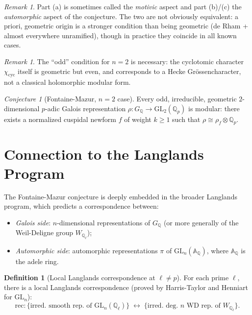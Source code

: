 \documentclass[12pt,a4paper]{amsart}
\theoremstyle{definition}
\newtheorem{definition}[theorem]{Definition}
\theoremstyle{remark}
\newtheorem{remark}[theorem]{Remark}
\newtheorem{conjecture}[theorem]{Conjecture}
\newcommand{\GL}{\mathrm{GL}}
\newcommand{\Qp}{\mathbb{Q}_p}
\newcommand{\GQ}{G_{\mathbb{Q}}}
\newcommand{\rec}{\mathrm{rec}}
\newcommand{\Q}{\mathbb{Q}}
\begin{document}
\begin{remark}
  Part (a) is sometimes called the \emph{motivic} aspect and part (b)/(c) the
  \emph{automorphic} aspect of the conjecture. The two are not obviously equivalent: a
  priori, geometric origin is a stronger condition than being geometric (de Rham + almost
  everywhere unramified), though in practice they coincide in all known cases.
\end{remark}

\begin{remark}
  The ``odd'' condition for $n=2$ is necessary: the cyclotomic character
  $\chi_{\mathrm{cyc}}$ itself is geometric but even, and corresponds to a Hecke
  Grössencharacter, not a classical holomorphic modular form.
\end{remark}

\begin{conjecture}[Fontaine-Mazur, $n=2$ case]\label{conj:FM2}
  Every odd, irreducible, geometric $2$-dimensional $p$-adic Galois representation
  $\rho\colon \GQ \to \GL_2(\Qp)$
  is modular: there exists a normalized cuspidal newform $f$ of weight $k \geq 1$ such
  that $\rho \cong \rho_f \otimes \Qp$.
\end{conjecture}

\section{Connection to the Langlands Program}\label{sec:langlands}

The Fontaine-Mazur conjecture is deeply embedded in the broader Langlands program, which
predicts a correspondence between:
\begin{itemize}
  \item \emph{Galois side}: $n$-dimensional representations of $\GQ$ (or more generally of
    the Weil-Deligne group $W_{\Q_\ell}$);
  \item \emph{Automorphic side}: automorphic representations $\pi$ of $\GL_n(\mathbb{A}_\Q)$,
    where $\mathbb{A}_\Q$ is the adele ring.
\end{itemize}

\begin{definition}[Local Langlands correspondence at $\ell \neq p$]
  For each prime $\ell$, there is a local Langlands correspondence (proved by Harris-Taylor
  \cite{HT2001} and Henniart \cite{Henniart2000} for $\GL_n$):
  \[
    \rec \colon \{ \text{irred.\ smooth rep.\ of } \GL_n(\Q_\ell) \} \;\longleftrightarrow\;
    \{ \text{irred.\ deg.\ $n$ WD rep.\ of } W_{\Q_\ell} \}.
  \]
\end{definition}
\end{document}

